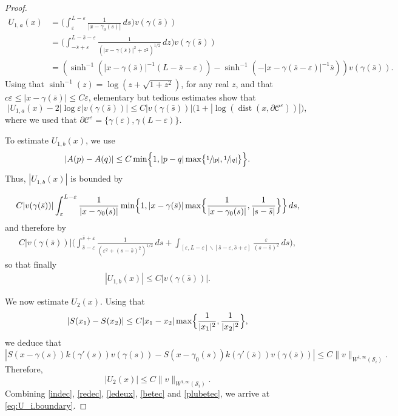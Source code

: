 \documentclass[10pt]{amsart}
\let\eps\varepsilon
\newcommand{\dd}{\,d}
\DeclareMathOperator{\dist}{dist}
\theoremstyle{definition}
\theoremstyle{remark}
\begin{document}
\begin{proof}
\begin{align}
\nonumber
U_{1,a} (x) &=
\biggl(\int_\eps^{L-\eps} \frac 1 {|x - \gamma_0(s)|} \dd s \biggr) v(\gamma (\bar s))
\\\label{here}
&= \biggl(\int_{- \bar s + \eps}^{L - \bar s - \eps} \frac{1}{(|x - \gamma(\bar s)|^2 + z^2)^{1/2}} \dd z \biggr) v(\gamma (\bar s))
\\ \nonumber
&= (\sinh^{-1}(|x - \gamma(\bar s)|^{-1} (L- \bar s - \eps)) - \sinh^{-1}(- |x - \gamma(\bar s - \eps)|^{-1} \bar s)) v(\gamma (\bar s)).
\end{align}
Using that $\sinh^{-1}(z) = \log(z + \sqrt{1 + z^2})$, for any real $z$, and that $c \eps \leq |x - \gamma(\bar s)| \leq C \eps$, elementary but tedious estimates show
that
\begin{equation}
\label{ledeux}
\big|U_{1,a} (x) - 2 \left|\log \eps \right| v(\gamma (\bar s))\big| \leq C |v(\gamma (\bar s))| { \bigl(1 + \left|\log(\dist(x,\partial \mathcal C^\eps))\right| \bigr)},
\end{equation}
{where we used that $\partial \mathcal C^\eps = \{\gamma(\eps),\gamma(L - \eps)\}$.}

To estimate $U_{1,b} (x)$, we use
\begin{equation}
|A(p) - A(q)| \leq C \min\Bigl\{ 1, |p-q| \max \bigl\{\sfrac 1 {|p|}, \sfrac 1 {|q|} \bigr\} \Bigr\}.
\end{equation}
Thus, $ |U_{1,b} (x)| $ is bounded by

\begin{gather*}
C {|v(\gamma (\bar s))|} \int_\eps^{L-\eps} \frac 1 {|x - \gamma_0(s)|} \min\Bigl\{ 1, |x - \gamma(\bar s)| \max \Bigl\{\frac 1 {|x - \gamma_0(s)|}, \frac 1 {|s-\bar s|} \Bigr\} \Bigr\} \dd s,
\end{gather*}
and therefore by
\begin{gather*}
C{|v(\gamma (\bar s))|} \biggl(\int_{\bar s - \eps}^{\bar s + \eps} \frac 1 {(\eps^2 + (s - \bar s)^2)^{1/2}} \dd s + \int_{[\eps,L -\eps] \smallsetminus [\bar s - \eps, \bar s + \eps]} \frac \eps {(s - \bar s)^2} \dd s \biggr),
\end{gather*}
so that finally
\begin{gather}
\label{betec}
|U_{1,b} (x)| \leq C {|v(\gamma (\bar s))|}.
\end{gather}

We now estimate $U_2 (x)$.
Using that
\begin{equation}
|S(x_1) - S(x_2)| \leq C |x_1 - x_2| \max \Bigl\{\frac 1 {|x_1|^2}, \frac 1 {|x_2|^2} \Bigr\},
\end{equation}
we deduce that
\begin{equation*}
|S(x - \gamma(s)) k(\gamma'(s)) v(\gamma (s)) - S(x - \gamma_0(s)) k(\gamma'(\bar s)) v(\gamma (\bar s))|
\leq C{\|v\|_{W^{1,\infty} (\mathcal S_i)}}.
\end{equation*}
Therefore,
\begin{equation}
\label{plubetec}
|U_2 (x) |\leq C{\|v\|_{W^{1,\infty} (\mathcal S_i)}}.
\end{equation}
Combining \eqref{indec}, \eqref{redec}, \eqref{ledeux}, \eqref{betec} and \eqref{plubetec}, we arrive at \eqref{eq:U_i.boundary}.
\end{proof}
\end{document}
